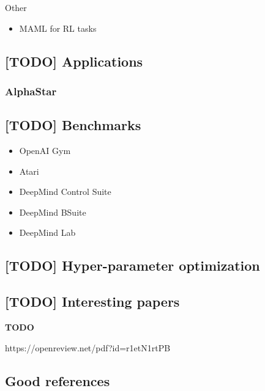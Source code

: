 \documentclass[12pt, english]{article}
\begin{document}
Other

\begin{itemize}
  \item MAML for RL tasks
\end{itemize}


\subsection{[TODO] Applications}

\subsubsection{AlphaStar}


\subsection{[TODO] Benchmarks}

\begin{itemize}
  \item OpenAI Gym
  \item Atari
  \item DeepMind Control Suite
  \item DeepMind BSuite
  \item DeepMind Lab
\end{itemize}

\subsection{[TODO] Hyper-parameter optimization}


\subsection{[TODO] Interesting papers}

\textbf{TODO}

https://openreview.net/pdf?id=r1etN1rtPB


\subsection{Good references}
\end{document}
